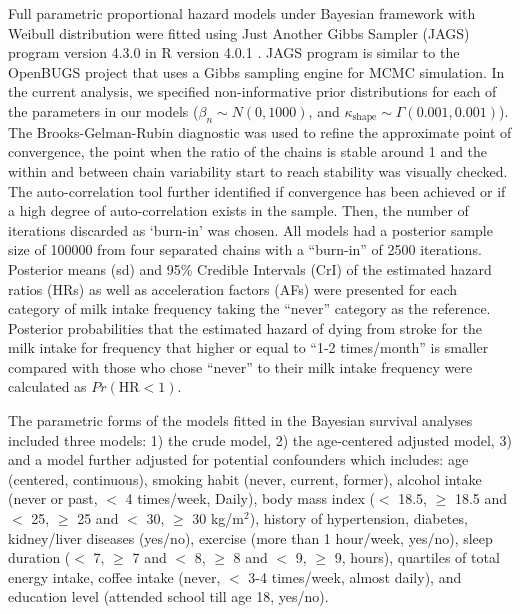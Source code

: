 \documentclass[nutrients,article,submitted,moreauthors,pdftex]{mdpi}
\begin{document}
Full parametric proportional hazard models under Bayesian framework with
Weibull distribution were fitted using Just Another Gibbs Sampler (JAGS)
program \citep{Plummer2003} version 4.3.0 in R version 4.0.1
\citep{RCT2020}. JAGS program is similar to the OpenBUGS
\citep{Lunn2009} project that uses a Gibbs sampling engine for MCMC
simulation. In the current analysis, we specified non-informative prior
distributions for each of the parameters in our models
(\(\beta_n \sim N(0, 1000)\), and
\(\kappa_{\text{shape}} \sim \Gamma(0.001, 0.001)\)). The
Brooks-Gelman-Rubin diagnostic \citep{Brooks1998} was used to refine the
approximate point of convergence, the point when the ratio of the chains
is stable around 1 and the within and between chain variability start to
reach stability was visually checked. The auto-correlation tool further
identified if convergence has been achieved or if a high degree of
auto-correlation exists in the sample. Then, the number of iterations
discarded as `burn-in' was chosen. All models had a posterior sample
size of 100000 from four separated chains with a ``burn-in'' of 2500
iterations. Posterior means (sd) and 95\% Credible Intervals (CrI) of
the estimated hazard ratios (HRs) as well as acceleration factors (AFs)
were presented for each category of milk intake frequency taking the
``never'' category as the reference. Posterior probabilities that the
estimated hazard of dying from stroke for the milk intake for frequency
that higher or equal to ``1-2 times/month'' is smaller compared with
those who chose ``never'' to their milk intake frequency were calculated
as \(Pr(\text{HR} < 1)\).

The parametric forms of the models fitted in the Bayesian survival
analyses included three models: 1) the crude model, 2) the age-centered
adjusted model, 3) and a model further adjusted for potential
confounders which includes: age (centered, continuous), smoking habit
(never, current, former), alcohol intake (never or past, \(<\) 4
times/week, Daily), body mass index (\(<\) 18.5, \(\geq\) 18.5 and \(<\)
25, \(\geq\) 25 and \(<\) 30, \(\geq\) 30 kg/m\(^2\)), history of
hypertension, diabetes, kidney/liver diseases (yes/no), exercise (more
than 1 hour/week, yes/no), sleep duration (\(<\) 7, \(\geq\) 7 and \(<\)
8, \(\geq\) 8 and \(<\) 9, \(\geq\) 9, hours), quartiles of total energy
intake, coffee intake (never, \(<\) 3-4 times/week, almost daily), and
education level (attended school till age 18, yes/no).
\end{document}
